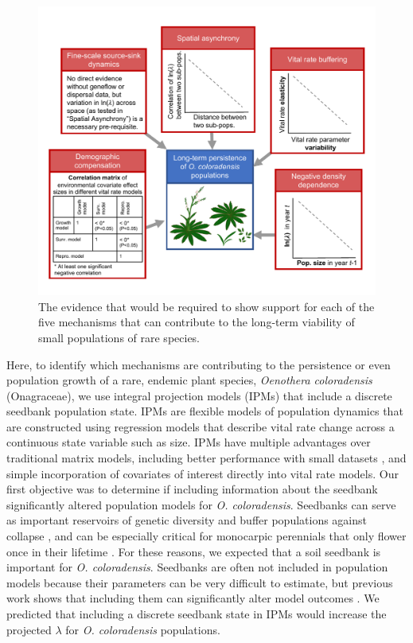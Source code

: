 \documentclass[12pt, letterpaper]{article}
\begin{document}
\begin{figure}[h]
  \centering
  \includegraphics[width=1\textwidth]{COBP_conceptualDiagram.pdf}
  \caption{The evidence that would be required to show support for each of the five mechanisms that can contribute to the long-term viability of small populations of rare species.}
  \label{fig:conceptualFigure}
\end{figure} 

Here, to identify which mechanisms are contributing to the persistence or even population growth of a rare, endemic plant species, \textit{Oenothera coloradensis} (Onagraceae), we use integral projection models (IPMs) \cite{Easterling2000} that include a discrete seedbank population state. IPMs are flexible models of population dynamics that are constructed using regression models that describe vital rate change across a continuous state variable such as size. IPMs have multiple advantages over traditional matrix models, including better performance with small datasets \cite{Ramula2009IntegralHerbs}, and simple incorporation of covariates of interest directly into vital rate models. Our first objective was to determine if including information about the seedbank significantly altered population models for \textit{O. coloradensis}. Seedbanks can serve as important reservoirs of genetic diversity and buffer populations against collapse \cite{Vitalis2004WhenPerenniality, Jongejans2006WhatRange}, and can be especially critical for monocarpic perennials that only flower once in their lifetime \cite{Rees2006}. For these reasons, we expected that a soil seedbank is important for \textit{O. coloradensis}. Seedbanks are often not included in population models because their parameters can be very difficult to estimate, but previous work shows that including them can significantly alter model outcomes \cite{Paniw2017, Nguyen2019ConsequencesModels}. We predicted that including a discrete seedbank state in IPMs would increase the projected $\lambda$ for \textit{O. coloradensis} populations. 
\end{document}
